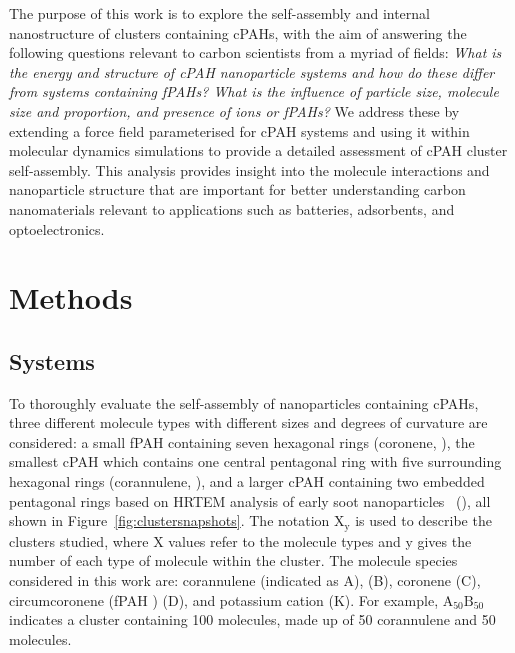 The purpose of this work is to explore the self-assembly and internal nanostructure of clusters containing cPAHs, with the aim of answering the following questions relevant to carbon scientists from a myriad of fields: \textit{What is the energy and structure of cPAH nanoparticle systems and how do these differ from systems containing fPAHs? What is the influence of particle size, molecule size and proportion, and presence of ions or fPAHs?}  We address these by extending a force field parameterised for cPAH systems and using it within molecular dynamics simulations to provide a detailed assessment of cPAH cluster self-assembly. This analysis provides insight into the molecule interactions and nanoparticle structure that are important for better understanding carbon nanomaterials relevant to applications such as batteries, adsorbents, and optoelectronics.

%
\section{Methods}
\subsection{Systems} %
To thoroughly evaluate the self-assembly of nanoparticles containing cPAHs, three different molecule types with different sizes and degrees of curvature are considered: a small fPAH containing seven hexagonal rings (coronene, ), the smallest cPAH which contains one central pentagonal ring with five surrounding hexagonal rings (corannulene, ), and a larger cPAH containing two embedded pentagonal rings based on HRTEM analysis of early soot nanoparticles~\cite{Martin2018flexo} (), all shown in Figure~\ref{fig:clustersnapshots}. The notation $\text{X}_{\text{y}}$ is used to describe the clusters studied, where X values refer to the molecule types and y gives the number of each type of molecule within the cluster. The molecule species considered in this work are: corannulene (indicated as A),  (B), coronene (C), circumcoronene (fPAH ) (D), and potassium cation (K). For example, $\text{A}_{\text{50}}\text{B}_{\text{50}}$ indicates a cluster containing 100 molecules, made up of 50 corannulene and 50  molecules.

